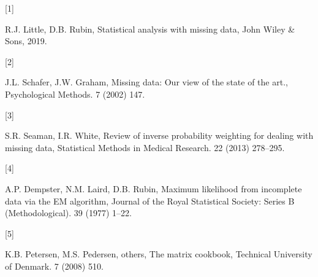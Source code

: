 \documentclass[
  twocolumn]{article}
\newlength{\cslhangindent}
\newlength{\csllabelwidth}
\newlength{\cslentryspacingunit} %
\newenvironment{CSLReferences}[2] %
 {%
  \setlength{\parindent}{0pt}
  \ifodd #1
  \let\oldpar\par
  \def\par{\hangindent=\cslhangindent\oldpar}
  \fi
  \setlength{\parskip}{#2\cslentryspacingunit}
 }%
 {}
\newcommand{\CSLLeftMargin}[1]{\parbox[t]{\csllabelwidth}{#1}}
\newcommand{\CSLRightInline}[1]{\parbox[t]{\linewidth - \csllabelwidth}{#1}\break}
\begin{document}
\hypertarget{refs}{}
\begin{CSLReferences}{0}{0}
\leavevmode{}%
\CSLLeftMargin{{[}1{]} }%
\CSLRightInline{R.J. Little, D.B. Rubin, Statistical analysis with
missing data, John Wiley \& Sons, 2019.}

\leavevmode{}%
\CSLLeftMargin{{[}2{]} }%
\CSLRightInline{J.L. Schafer, J.W. Graham, Missing data: Our view of the
state of the art., Psychological Methods. 7 (2002) 147.}

\leavevmode{}%
\CSLLeftMargin{{[}3{]} }%
\CSLRightInline{S.R. Seaman, I.R. White, Review of inverse probability
weighting for dealing with missing data, Statistical Methods in Medical
Research. 22 (2013) 278--295.}

\leavevmode{}%
\CSLLeftMargin{{[}4{]} }%
\CSLRightInline{A.P. Dempster, N.M. Laird, D.B. Rubin, Maximum
likelihood from incomplete data via the EM algorithm, Journal of the
Royal Statistical Society: Series B (Methodological). 39 (1977) 1--22.}

\leavevmode{}%
\CSLLeftMargin{{[}5{]} }%
\CSLRightInline{K.B. Petersen, M.S. Pedersen, others, The matrix
cookbook, Technical University of Denmark. 7 (2008) 510.}

\end{CSLReferences}
\end{document}
